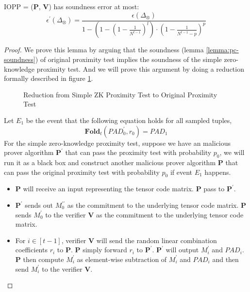 \begin{lemma}
\label{lemma:szkpctc-soundness}


IOPP = ($\textbf{P}$, $\textbf{V}$) has soundness error at most:
$$
    \epsilon^\prime(\Delta_\otimes) = 
    \frac{ \epsilon(\Delta_\otimes)}{1 - (1 - (1 - \frac{1}{N^{t-1}})^l) \cdot (1 - \frac{1}{N^{t-1} - p})^p }
$$

\end{lemma}
\begin{proof}

We prove this lemma by arguing that the soundness (lemma \ref{lemma:pc-soundness}) of original proximity test implies the soundness of the simple zero-knowledge proximity test. And we will prove this argument by doing a reduction formally described in figure \ref{img:red-soundness}.

\begin{figure}[ht]
\centering
\resizebox{\textwidth}{!}{

}
\caption{Reduction from Simple ZK Proximity Test to Original Proximity Test}
\label{img:red-soundness}
\end{figure}

Let $E_1$ be the event that the following equation holds for all sampled tuples,
$$
    \textbf{Fold}_{t}(PAD_{0}^\prime, r_0) = PAD_1
$$
For the simple zero-knowledge proximity test, suppose we have an malicious prover algorithm $\textbf{P}^\prime$ that can pass the proximity test with probability $p_0$, we will run it as a black box and construct another malicious prover algorithm $\textbf{P}$ that can pass the original proximity test with probability $p_0$ if event $E_1$ happens.

\begin{itemize}
    \item $\textbf{P}$ will receive an input \mzeroprime representing the tensor code matrix. \textbf{P} pass \mzeroprime to $\textbf{P}^\prime$.
    
    \item $\textbf{P}^\prime$ sends out $M_0^{\prime\prime}$ as the commitment to the underlying tensor code matrix. 
    \textbf{P} sends $M_0^\prime$ to the verifier \textbf{V}  as the commitment to the underlying tensor code matrix.
    
    \item For $i \in [t-1]$, verifier \textbf{V} will send the random linear combination coefficients $r_i$ to \textbf{P}. \textbf{P} simply forward $r_i$ to $\textbf{P}^\prime$. $\textbf{P}^\prime$ will output $M_i^\prime$ and $PAD_i$. \textbf{P} then compute $M_i^\prime$ as element-wise subtraction of $M_i^\prime$ and $PAD_i$ and then send $M_i^\prime$ to the verifier \textbf{V}. 
    

\end{itemize}
\end{proof}
